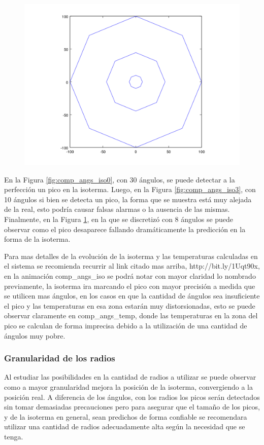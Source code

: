 \begin{figure}[H]
\begin{minipage}{0.30\textwidth}
  \centering
    \includegraphics[width=1\textwidth]{imgs/comp_angulos/comp_angs_iso4.png} 
  \caption{}
  \label{fig:comp_angs_iso4}
\end{minipage}

\end{figure}

En la Figura \ref{fig:comp_angs_iso0}, con 30 ángulos, se puede detectar a la perfección un pico en la isoterma. Luego, en la Figura \ref{fig:comp_angs_iso3}, con 10 ángulos si bien se detecta un pico, la forma que se muestra está muy alejada de la real, esto podría causar falsas alarmas o la ausencia de las mismas.
Finalmente, en la Figura \ref{fig:comp_angs_iso4}, en la que se discretizó con 8 ángulos se puede observar como el pico desaparece fallando dramáticamente la predicción en la forma de la isoterma.

Para mas detalles de la evolución de la isoterma y las temperaturas calculadas en el sistema se recomienda recurrir al link citado mas arriba, http://bit.ly/1Uqt90x, en la animación comp\_angs\_iso se podrá notar con mayor claridad lo nombrado previamente, la isoterma ira marcando el pico con mayor precisión a medida que se utilicen mas ángulos, en los casos en que la cantidad de ángulos sea insuficiente el pico y las temperaturas en esa zona estarán muy distorsionadas, esto se puede observar claramente en comp\_angs\_temp, donde las temperaturas en la zona del pico se calculan de forma imprecisa debido a la utilización de una cantidad de ángulos muy pobre.


\subsubsection{Granularidad de los radios}
Al estudiar las posibilidades en la cantidad de radios a utilizar se puede observar como a mayor granularidad mejora la posición de la isoterma, convergiendo a la posición real. A diferencia de los ángulos, con los radios los picos serán detectados sin tomar demasiadas precauciones pero para asegurar que el tamaño de los picos, y de la isoterma en general, sean predichos de forma confiable se recomendara utilizar una cantidad de radios adecuadamente alta según la necesidad que se tenga.

